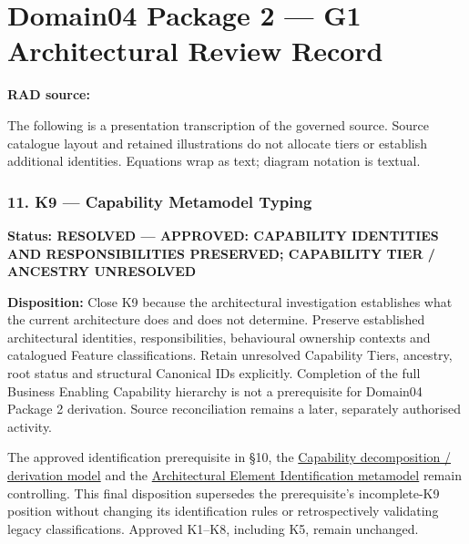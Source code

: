 \chapter{Domain04 Package 2 — G1 Architectural Review Record}\label{rad:k9}
\noindent\textbf{RAD source:} \texttt{}

The following is a presentation transcription of the governed source. Source catalogue layout and retained illustrations do not allocate tiers or establish additional identities. Equations wrap as text; diagram notation is textual.

\label{rad:k9:1392}
\subsection*{11. K9 — Capability Metamodel Typing}
\label{rad:k9:1394}

\textbf{Status: RESOLVED — APPROVED: CAPABILITY IDENTITIES AND RESPONSIBILITIES PRESERVED; CAPABILITY TIER /\allowbreak{} ANCESTRY UNRESOLVED}

\label{rad:k9:1396}

\textbf{Disposition:} Close K9 because the architectural investigation establishes what the current architecture does and does not determine. Preserve established architectural identities, responsibilities, behavioural ownership contexts and catalogued Feature classifications. Retain unresolved Capability Tiers, ancestry, root status and structural Canonical IDs explicitly. Completion of the full Business Enabling Capability hierarchy is not a prerequisite for Domain04 Package 2 derivation. Source reconciliation remains a later, separately authorised activity.

\label{rad:k9:1398}

The approved identification prerequisite in §10, the \hyperref[rad:tier-model]{Capability decomposition /\allowbreak{} derivation model} and the \hyperref[rad:metamodel:319]{Architectural Element Identification metamodel} remain controlling. This final disposition supersedes the prerequisite's incomplete-K9 position without changing its identification rules or retrospectively validating legacy classifications. Approved K1–K8, including K5, remain unchanged.

\label{rad:k9:1400}
